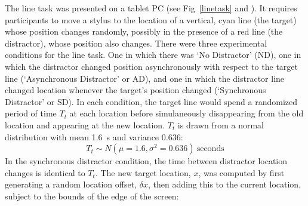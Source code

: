 \documentclass[10pt,letterpaper]{article}
\begin{document}
The line task was presented on a tablet PC (see Fig~\ref{linetask}
and \cite{notremor_video_2015}). It requires participants to move a
stylus to the location of a vertical, cyan line (the target) whose
position changes randomly, possibly in the presence of a red line (the
distractor), whose position also changes. There were three
experimental conditions for the line task. One in which there was `No
Distractor' (ND), one in which the distractor changed position
asynchronously with respect to the target line (`Asynchronous
Distractor' or AD), and one in which the distractor line changed
location whenever the target's position changed (`Synchronous
Distractor' or SD). In each condition, the target line would spend a
randomized period of time $T_t$ at each location before simulaneously
disappearing from the old location and appearing at the new
location. $T_t$ is drawn from a normal distribution with mean 1.6~s
and variance 0.636:
%
%
\begin{equation}\label{eq:tau_target}
  T_t \sim N(\mu=1.6,\sigma^2=0.636)~\text{seconds}
\end{equation}
%
%
%
%
%
%
%
In the synchronous distractor condition, the time between distractor
location changes is identical to $T_t$. The new target location, $x$,
was computed by first generating a random location offset,
${\delta}x$, then adding this to the current location, subject to the
bounds of the edge of the screen:
\end{document}
